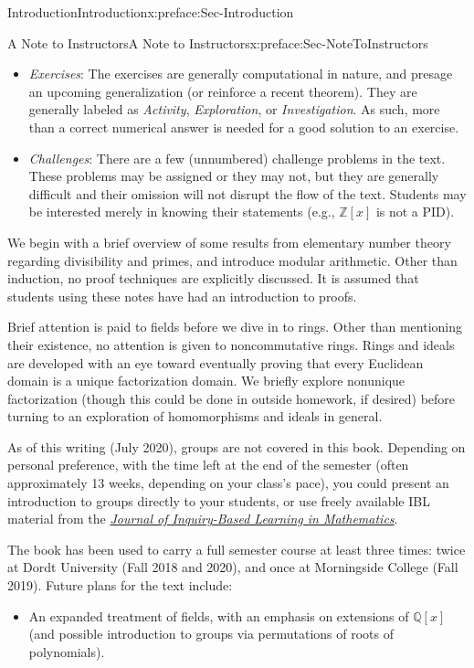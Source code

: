 \documentclass[oneside,10pt,]{book}
\numberwithin{equation}{section}
\def\Z{{\mathbb Z}}
\def\Q{{\mathbb Q}}
\begin{document}
\begin{preface}{Introduction}{}{Introduction}{}{}{x:preface:Sec-Introduction}
\begin{preface}{A Note to Instructors}{}{A Note to Instructors}{}{}{x:preface:Sec-NoteToInstructors}
\begin{itemize}[label=\textbullet]
\item{}\emph{Exercises}: The exercises are generally computational in nature, and presage an upcoming generalization (or reinforce a recent theorem). They are generally labeled as \emph{Activity}, \emph{Exploration}, or \emph{Investigation}. As such, more than a correct numerical answer is needed for a good solution to an exercise.%
\item{}\emph{Challenges}: There are a few (unnumbered) challenge problems in the text. These problems may be assigned or they may not, but they are generally difficult and their omission will not disrupt the flow of the text. Students may be interested merely in knowing their statements (e.g., \(\Z[x]\) is not a PID).%
\end{itemize}
%
\par
We begin with a brief overview of some results from elementary number theory regarding divisibility and primes, and introduce modular arithmetic. Other than induction, no proof techniques are explicitly discussed. It is assumed that students using these notes have had an introduction to proofs.%
\par
Brief attention is paid to fields before we dive in to rings. Other than mentioning their existence, no attention is given to noncommutative rings. Rings and ideals are developed with an eye toward eventually proving that every Euclidean domain is a unique factorization domain. We briefly explore nonunique factorization (though this could be done in outside homework, if desired) before turning to an exploration of homomorphisms and ideals in general.%
\par
As of this writing (July 2020), groups are not covered in this book. Depending on personal preference, with the time left at the end of the semester (often approximately 1\textendash{}3 weeks, depending on your class's pace), you could present an introduction to groups directly to your students, or use freely available IBL material from the \href{http://jiblm.org/}{\emph{Journal of Inquiry-Based Learning in Mathematics}}.%
\par
The book has been used to carry a full semester course at least three times: twice at Dordt University (Fall 2018 and 2020), and once at Morningside College (Fall 2019). Future plans for the text include:%
\begin{itemize}[label=\textbullet]
\item{}An expanded treatment of fields, with an emphasis on extensions of \(\Q[x]\) (and possible introduction to groups via permutations of roots of polynomials).%

\end{itemize}
\end{preface}
\end{preface}
\end{document}

